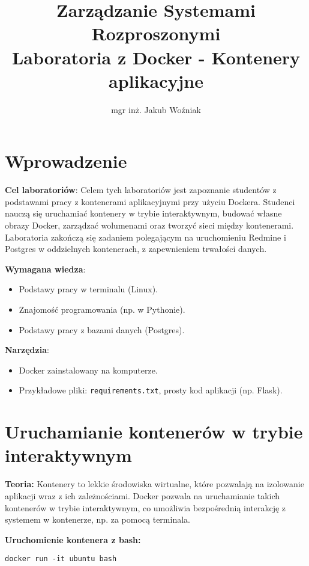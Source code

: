 \documentclass{article}
\title{Zarządzanie Systemami Rozproszonymi\\Laboratoria z Docker - Kontenery aplikacyjne}
\author{mgr inż. Jakub Woźniak}
\date{}
\begin{document}
\maketitle

\section*{Wprowadzenie}

\textbf{Cel laboratoriów}:  
Celem tych laboratoriów jest zapoznanie studentów z podstawami pracy z kontenerami aplikacyjnymi przy użyciu Dockera. Studenci nauczą się uruchamiać kontenery w trybie interaktywnym, budować własne obrazy Docker, zarządzać wolumenami oraz tworzyć sieci między kontenerami. Laboratoria zakończą się zadaniem polegającym na uruchomieniu Redmine i Postgres w oddzielnych kontenerach, z zapewnieniem trwałości danych.

\textbf{Wymagana wiedza}:  
\begin{itemize}
    \item Podstawy pracy w terminalu (Linux).
    \item Znajomość programowania (np. w Pythonie).
    \item Podstawy pracy z bazami danych (Postgres).
\end{itemize}

\textbf{Narzędzia}:  
\begin{itemize}
    \item Docker zainstalowany na komputerze.
    \item Przykładowe pliki: \texttt{requirements.txt}, prosty kod aplikacji (np. Flask).
\end{itemize}

\section{Uruchamianie kontenerów w trybie interaktywnym}

\textbf{Teoria:}  
Kontenery to lekkie środowiska wirtualne, które pozwalają na izolowanie aplikacji wraz z ich zależnościami. Docker pozwala na uruchamianie takich kontenerów w trybie interaktywnym, co umożliwia bezpośrednią interakcję z systemem w kontenerze, np. za pomocą terminala.

\textbf{Uruchomienie kontenera z bash:}

\noindent\begin{lstlisting}
docker run -it ubuntu bash
\end{lstlisting}
\end{document}
